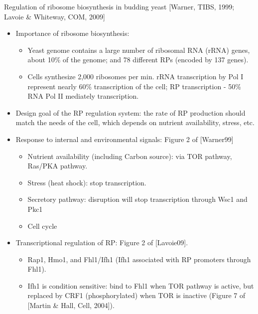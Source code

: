 \documentclass{report}
\begin{document}
Regulation of ribosome biosynthesis in budding yeast [Warner, TIBS, 1999; Lavoie \& Whiteway, COM, 2009]
\begin{itemize}
	\item Importance of ribosome biosynthesis: 
	\begin{itemize}
		\item Yeast genome contains a large number of ribosomal RNA (rRNA) genes, about 10\% of the genome; and 78 different RPs (encoded by 137 genes). 
		\item Cells synthesize 2,000 ribosomes per min. rRNA transcription by Pol I represent nearly 60\% transcription of the cell; RP transcription - 50\% RNA Pol II mediately transcription. 
	\end{itemize}
	
	\item Design goal of the RP regulation system: the rate of RP production should match the needs of the cell, which depends on nutrient availability, stress, etc. 
	
	\item Response to internal and environmental signals: Figure 2 of [Warner99]
	\begin{itemize}
		\item Nutrient availability (including Carbon source): via TOR pathway, Ras/PKA pathway. 
		\item Stress (heat shock): stop transcription. 
		\item Secretory pathway: disruption will stop transcription through Wsc1 and Pkc1
		\item Cell cycle
	\end{itemize}
	
	\item Transcriptional regulation of RP: Figure 2 of [Lavoie09]. 
	\begin{itemize}
		\item Rap1, Hmo1, and Fhl1/Ifh1 (Ifh1 associated with RP promoters through Fhl1). 
		\item Ifh1 is condition sensitive: bind to Fhl1 when TOR pathway is active, but replaced by CRF1 (phosphorylated) when TOR is inactive (Figure 7 of [Martin \& Hall, Cell, 2004]). 
	\end{itemize}
\end{itemize}
\end{document}
